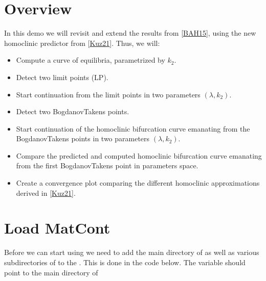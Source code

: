 \documentclass[letterpaper,10pt,english]{jupyterBook}
\begin{document}
\section{Overview}
\label{\detokenize{CO-oxidation:overview}}
\sphinxAtStartPar
In this demo we will revisit and extend the results from {[}\hyperlink{cite.references:id5}{BAH15}{]},
using the new homoclinic predictor from {[}\hyperlink{cite.references:id3}{Kuz21}{]}. Thus, we will:
\begin{itemize}
\item {} 
\sphinxAtStartPar
Compute a curve of equilibria, parametrized by \(k_2\).

\item {} 
\sphinxAtStartPar
Detect two limit points (LP).

\item {} 
\sphinxAtStartPar
Start continuation from the limit points in two parameters \((\lambda,k_2)\).

\item {} 
\sphinxAtStartPar
Detect two Bogdanov\sphinxhyphen{}Takens points.

\item {} 
\sphinxAtStartPar
Start continuation of the homoclinic bifurcation curve emanating from the
Bogdanov\sphinxhyphen{}Takens points in two parameters \((\lambda,k_2)\).

\item {} 
\sphinxAtStartPar
Compare the predicted and computed homoclinic bifurcation curve emanating
from the first Bogdanov\sphinxhyphen{}Takens point in parameters space.

\item {} 
\sphinxAtStartPar
Create a convergence plot comparing the different homoclinic approximations
derived in {[}\hyperlink{cite.references:id3}{Kuz21}{]}.

\end{itemize}


\section{Load MatCont}
\label{\detokenize{CO-oxidation:load-matcont}}
\sphinxAtStartPar
Before we can start using  we need to add the main directory of
 as well as various subdirectories of  to the . This is done in the code below. The variable 
should point to the main directory of 
\end{document}

